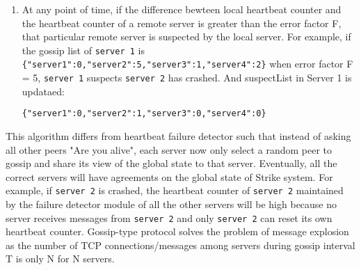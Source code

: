 \documentclass[dareport.tex]{subfiles}
\begin{document}
\begin{enumerate}[leftmargin=*]
\item At any point of time, if the difference bewteen local heartbeat counter and the heartbeat counter of a remote server is greater than the error factor F, that particular remote server is suspected by the local server. For example, if the gossip list of \verb|server 1| is \verb|{"server1":0,"server2":5,"server3":1,"server4":2}| when error factor F = 5, \verb|server 1| suspects \verb|server 2| has crashed. And suspectList in Server 1 is updataed:

\verb|{"server1":0,"server2":1,"server3":0,"server4":0}|

\end{enumerate}

This algorithm differs from heartbeat failure detector such that instead of asking all other peers "Are you alive", each server now only select a random peer to gossip and share its view of the global state to that server. Eventually, all the correct servers will have agreements on the global state of Strike system. For example, if \verb|server 2| is crashed, the heartbeat counter of \verb|server 2| maintained by the failure detector module of all the other servers will be high because no server receives messages from \verb|server 2| and only \verb|server 2| can reset its own heartbeat counter. Gossip-type protocol solves the problem of message explosion as the number of TCP connections/messages among servers during gossip interval T is only N for N servers.
\end{document}
